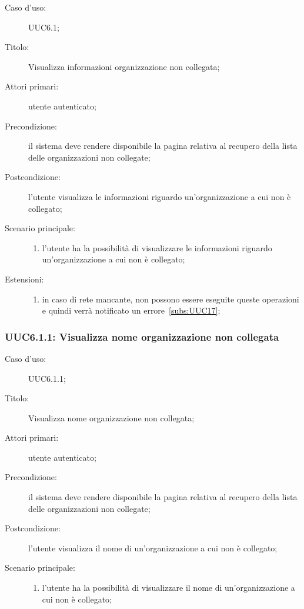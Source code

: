 \documentclass[../../../analisi-dei-requisiti.tex]{subfiles}
\begin{document}
\begin{description}
  \item[Caso d'uso:] UUC6.1;
  \item[Titolo:] Visualizza informazioni organizzazione non collegata;
  \item[Attori primari:] utente autenticato;
  \item[Precondizione:] il sistema deve rendere disponibile la pagina relativa al recupero della lista delle organizzazioni non collegate;
  \item[Postcondizione:] l'utente visualizza le informazioni riguardo un'organizzazione a cui non è collegato;
  \item[Scenario principale:]
        \begin{enumerate}
          \item l'utente ha la possibilità di visualizzare le informazioni riguardo un'organizzazione a cui non è collegato;
        \end{enumerate}
  \item[Estensioni:]
        \begin{enumerate}
          \item in caso di rete mancante, non possono essere eseguite queste operazioni e quindi verrà notificato un errore~\ref{subs:UUC17};
        \end{enumerate}
\end{description}


\subsubsection{UUC6.1.1: Visualizza nome organizzazione non collegata}%
\label{subs:UUC6.1.1}
\begin{description}
  \item[Caso d'uso:] UUC6.1.1;
  \item[Titolo:] Visualizza nome organizzazione non collegata;
  \item[Attori primari:] utente autenticato;
  \item[Precondizione:] il sistema deve rendere disponibile la pagina relativa al recupero della lista delle organizzazioni non collegate;
  \item[Postcondizione:] l'utente visualizza il nome di un'organizzazione a cui non è collegato;
  \item[Scenario principale:]
        \begin{enumerate}
          \item l'utente ha la possibilità di visualizzare il nome di un'organizzazione a cui non è collegato;
        \end{enumerate}
\end{description}
\end{document}
